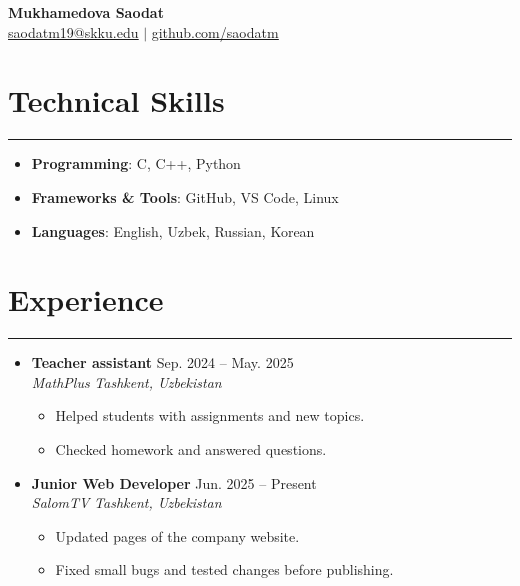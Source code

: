 \documentclass[letterpaper, 10pt]{article}
\begin{document}
 
\begin{center} 
\textbf{\LARGE Mukhamedova Saodat} \\ \vspace{2pt} 
\href{mailto:yourmail@skku.edu}{\underline{saodatm19@skku.edu}} $|$ 
\href{https://github.com/yourid}{\underline{github.com/saodatm}} 
\end{center} 
\section*{Technical Skills} 
\hrule 
\vspace{4pt} 
\begin{itemize} 
\item[] \textbf{Programming}: C, C++, Python %
\item[] \textbf{Frameworks \& Tools}: GitHub, VS Code, Linux  %
\item[] \textbf{Languages}: English, Uzbek, Russian, Korean %
\end{itemize} 
\section*{Experience} 
\hrule 
\vspace{4pt} 
\begin{itemize} 
\item[] 
\textbf{Teacher assistant} \hfill Sep. 2024 -- May. 2025 \\ %
\textit{MathPlus} \hfill \textit{Tashkent, Uzbekistan} 
\begin{itemize} 
\item Helped students with assignments and new topics.
\item Checked homework and answered questions. 
\end{itemize} 
\item[] 
\textbf{Junior Web Developer} \hfill Jun. 2025 -- Present \\ %
\textit{SalomTV} \hfill \textit{Tashkent, Uzbekistan} 
\begin{itemize} 
\item Updated pages of the company website. 
\item Fixed small bugs and tested changes before publishing. 
\end{itemize} 
\end{itemize} 
\end{document}
